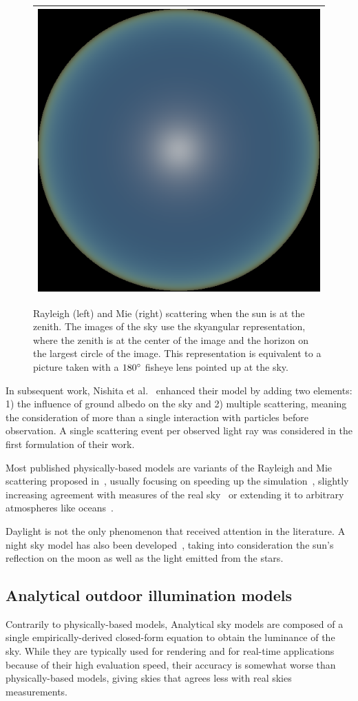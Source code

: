 \begin{figure}
\begin{tabular}{|c|c|}
\multicolumn{2}{|c|}{
\includegraphics[width=0.25\linewidth]{simulation/skydome.png}} \\ \hline
\end{tabular}
\caption[Visualisations of the Rayleigh and Mie scattering]{Rayleigh (left) and Mie (right) scattering when the sun is at the zenith. The images of the sky use the skyangular representation, where the zenith is at the center of the image and the horizon on the largest circle of the image. This representation is equivalent to a picture taken with a $180^{\circ}$ fisheye lens pointed up at the sky.}
\label{fig:physics_simulations}
\end{figure}

In subsequent work, Nishita et al.~\cite{nishita1996display} enhanced their model by adding two elements: 1) the influence of ground albedo on the sky and 2) multiple scattering, meaning the consideration of more than a single interaction with particles before observation. A single scattering event per observed light ray was considered in the first formulation of their work.

Most published physically-based models are variants of the Rayleigh and Mie scattering proposed in~\cite{nishita1993display}, usually focusing on speeding up the simulation~\cite{oneal2005accurate}, slightly increasing agreement with measures of the real sky~\cite{haber2005physically,bruneton2008precomputed} or extending it to arbitrary atmospheres like oceans~\cite{elek2010real}.

Daylight is not the only phenomenon that received attention in the literature. A night sky model has also been developed~\cite{jensen2001nightskymodel}, taking into consideration the sun's reflection on the moon as well as the light emitted from the stars.

\subsection{Analytical outdoor illumination models}


Contrarily to physically-based models, Analytical sky models are composed of a single empirically-derived closed-form equation to obtain the luminance of the sky. While they are typically used for rendering and for real-time applications because of their high evaluation speed, their accuracy is somewhat worse than physically-based models, giving skies that agrees less with real skies measurements.

